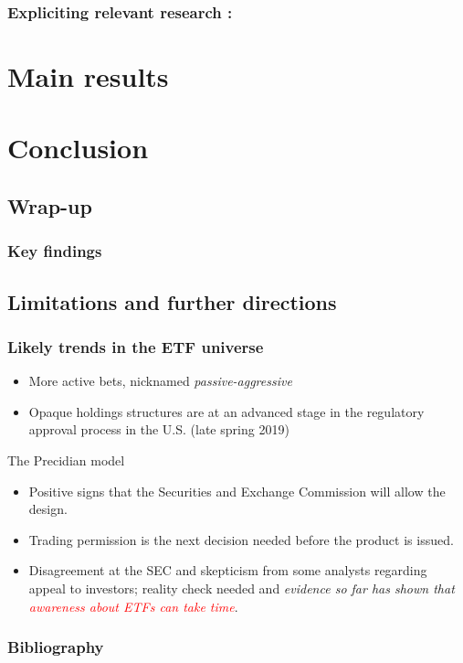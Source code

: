 \documentclass[9pt]{beamer}
\begin{document}
\begin{frame}
  \frametitle{Expliciting relevant research : \textcite{Israeli2017}}
\end{frame}

\section{Main results}


\section{Conclusion}
\subsection{Wrap-up}

\begin{frame}
  \frametitle{Key findings}
\end{frame}

\subsection{Limitations and further directions}

\begin{frame}[allowframebreaks]
  \frametitle{Likely trends in the ETF universe}
  \begin{itemize}
  \item More active bets, nicknamed \textit{passive-aggressive}
  \item Opaque holdings structures are at an advanced stage in the regulatory approval process in the U.S. (late spring 2019)
    
  \end{itemize}
  \begin{block}{The Precidian model}
    \begin{itemize}
    \item Positive signs that the Securities and Exchange Commission will allow the design.
    \item Trading permission is the next decision needed before the product is issued.
    \item Disagreement at the SEC and skepticism from some analysts regarding appeal to investors; reality check needed and \textit{evidence so far has shown that \textcolor{red}{awareness about ETFs can take time}}.
    \end{itemize}
    
  \end{block}
  
\end{frame}


\begin{frame}
  \frametitle{Bibliography}
  \printbibliography
\end{frame}
\end{document}
